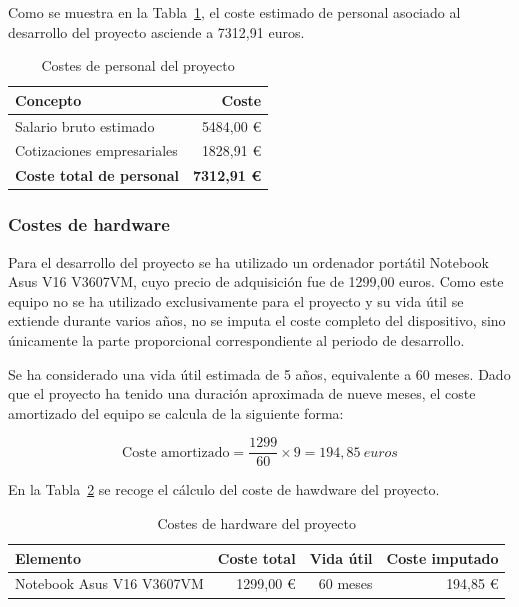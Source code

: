 Como se muestra en la Tabla~\ref{tab:costes-personal}, el coste estimado de personal asociado al desarrollo del proyecto asciende a 7312,91 euros.

\begin{table}[H]
\centering
\begin{tabular}{l r}
	\toprule
	\textbf{Concepto} & \textbf{Coste} \\
	\midrule
	Salario bruto estimado & 5484,00 € \\
	Cotizaciones empresariales & 1828,91 € \\
	\midrule
	\textbf{Coste total de personal} & \textbf{7312,91 €} \\
	\bottomrule
\end{tabular}
\caption{Costes de personal del proyecto}
\label{tab:costes-personal}
\end{table}


\subsubsection{Costes de hardware}

Para el desarrollo del proyecto se ha utilizado un ordenador portátil Notebook Asus V16 V3607VM, cuyo precio de adquisición fue de 1299,00 euros. Como este equipo no se ha utilizado exclusivamente para el proyecto y su vida útil se extiende durante varios años, no se imputa el coste completo del dispositivo, sino únicamente la parte proporcional correspondiente al periodo de desarrollo.

Se ha considerado una vida útil estimada de 5 años, equivalente a 60 meses. Dado que el proyecto ha tenido una duración aproximada de nueve meses, el coste amortizado del equipo se calcula de la siguiente forma:

\[
\text{Coste amortizado} = \frac{1299}{60} \times 9 = 194,85\ euros
\]

En la Tabla~\ref{tab:costes-hardware} se recoge el cálculo del coste de hawdware del proyecto.

\begin{table}[H]
	\centering
	\begin{tabular}{l r r r}
		\toprule
		\textbf{Elemento} & \textbf{Coste total} & \textbf{Vida útil} & \textbf{Coste imputado} \\
		\midrule
		Notebook Asus V16 V3607VM & 1299,00 € & 60 meses & 194,85 € \\
		\bottomrule
	\end{tabular}
	\caption{Costes de hardware del proyecto}
	\label{tab:costes-hardware}
\end{table}

